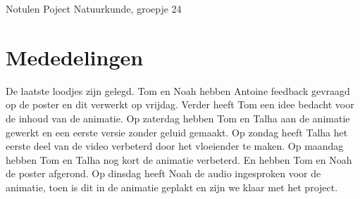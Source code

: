 \documentclass[11pt,a4paper]{article}
\begin{document}
\begin{Minutes}{Notulen Poject Natuurkunde, groepje 24}


\endtime{}
\location{}




\maketitle



\newpage


\section{Mededelingen} 
De laatste loodjes zijn gelegd. Tom en Noah hebben Antoine feedback gevraagd op de poster en dit verwerkt op vrijdag. Verder heeft Tom een idee bedacht voor de inhoud van de animatie. Op zaterdag hebben Tom en Talha aan de animatie gewerkt en een eerste versie zonder geluid gemaakt. Op zondag heeft Talha het eerste deel van de video verbeterd door het vloeiender te maken. Op maandag hebben Tom en Talha nog kort de animatie verbeterd. En hebben Tom en Noah de poster afgerond. Op dinsdag heeft Noah de audio ingesproken voor de animatie, toen is dit in de animatie geplakt en zijn we klaar met het project.



\end{Minutes}
\end{document}

